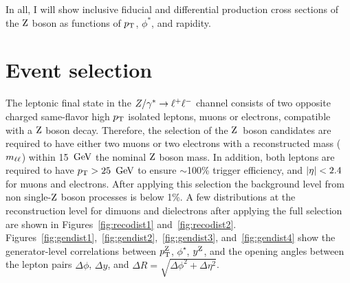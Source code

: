 In all, I will show inclusive fiducial and differential production cross sections of 
the $\mathrm{Z}$ boson as functions of $p_{\mathrm{T}}$, $\phi^*$, and rapidity. 

\section{Event selection}
The leptonic final state in the $Z/\gamma^*\to\ell^+\ell^-$ channel consists of two opposite 
charged same-flavor high $p_{\mathrm{T}}$ isolated leptons, muons or electrons, 
compatible with a $\mathrm{Z}$ boson decay. Therefore, the selection of the 
$\mathrm{Z}$~boson candidates are required to have either two muons or two electrons 
with a reconstructed mass ($m_{\ell\ell}$) within 15 $\,\text{Ge\hspace{-.08em}V}$ the nominal $\mathrm{Z}$ boson mass. In addition, 
both leptons are required to have $p_{\mathrm{T}}>25~\,\text{Ge\hspace{-.08em}V}$ to ensure $\sim$100\% trigger 
efficiency, and $\lvert \eta \rvert<2.4$ for muons and electrons. 
After applying this selection the background level from non single-$\mathrm{Z}$ boson 
processes is below 1\%. A few distributions at the reconstruction level 
for dimuons and dielectrons after applying the full selection are 
shown in Figures~\ref{fig:recodist1} and~\ref{fig:recodist2}. 
Figures~\ref{fig:gendist1},~\ref{fig:gendist2},~\ref{fig:gendist3}, and~\ref{fig:gendist4} show the generator-level
correlations between $p_{\mathrm{T}}^{\mathrm{Z}}$, $\phi^\star$, $y^{\mathrm{Z}}$, and the opening angles between the lepton pairs $\Delta\phi$, $\Delta y$, and 
$\Delta R = \sqrt{ \Delta\phi^{2} + \Delta\eta^{2} }$.

